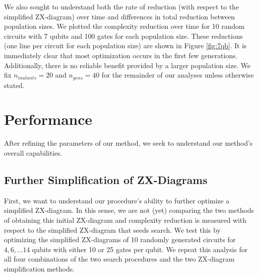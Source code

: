 We also sought to understand both the rate of reduction (with respect to the simplified ZX-diagram) over time and differences in total reduction between population sizes.
We plotted the complexity reduction over time for 10 random circuits with 7 qubits and 100 gates for each population size.
These reductions (one line per circuit for each population size) are shown in Figure \ref{fig:7qb}.
It is immediately clear that most optimization occurs in the first few generations.
Additionally, there is no reliable benefit provided by a larger population size.
We fix $n_{mutants} = 20$ and $n_{gens} = 40$ for the remainder of our analyses unless otherwise stated.

\section{Performance}

After refining the parameters of our method, we seek to understand our method's overall capabilities.

\subsection*{Further Simplification of ZX-Diagrams}

First, we want to understand our procedure's ability to further optimize a simplified ZX-diagram.
In this sense, we are not (yet) comparing the two methods of obtaining this initial ZX-diagram and complexity reduction is measured with respect to the simplified ZX-diagram that seeds search.
We test this by optimizing the simplified ZX-diagrams of 10 randomly generated circuits for $4, 6, \dots 14$ qubits with either 10 or 25 gates per qubit.
We repeat this analysis for all four combinations of the two search procedures and the two ZX-diagram simplification methods.


